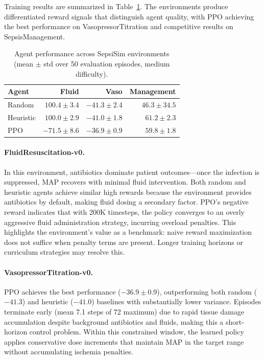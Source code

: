 \documentclass[11pt,a4paper]{article}
\begin{document}
Training results are summarized in Table~\ref{tab:results}. The environments produce differentiated reward signals that distinguish agent quality, with PPO achieving the best performance on VasopressorTitration and competitive results on SepsisManagement.

\begin{table}[htbp]
\centering
\caption{Agent performance across SepsiSim environments (mean $\pm$ std over 50 evaluation episodes, medium difficulty).}
\label{tab:results}
\begin{tabular}{lrrr}
\toprule
\textbf{Agent} & \textbf{Fluid} & \textbf{Vaso} & \textbf{Management} \\
\midrule
Random     & $100.4 \pm 3.4$ & $-41.3 \pm 2.4$ & $46.3 \pm 34.5$ \\
Heuristic  & $100.0 \pm 2.9$ & $-41.0 \pm 1.8$ & $61.2 \pm 2.3$ \\
PPO        & $-71.5 \pm 8.6$ & $\mathbf{-36.9 \pm 0.9}$ & $59.8 \pm 1.8$ \\
\bottomrule
\end{tabular}
\end{table}

\paragraph{FluidResuscitation-v0.} In this environment, antibiotics dominate patient outcomes---once the infection is suppressed, MAP recovers with minimal fluid intervention. Both random and heuristic agents achieve similar high rewards because the environment provides antibiotics by default, making fluid dosing a secondary factor. PPO's negative reward indicates that with 200K timesteps, the policy converges to an overly aggressive fluid administration strategy, incurring overload penalties. This highlights the environment's value as a benchmark: naive reward maximization does not suffice when penalty terms are present. Longer training horizons or curriculum strategies may resolve this.

\paragraph{VasopressorTitration-v0.} PPO achieves the best performance ($-36.9 \pm 0.9$), outperforming both random ($-41.3$) and heuristic ($-41.0$) baselines with substantially lower variance. Episodes terminate early (mean 7.1 steps of 72 maximum) due to rapid tissue damage accumulation despite background antibiotics and fluids, making this a short-horizon control problem. Within this constrained window, the learned policy applies conservative dose increments that maintain MAP in the target range without accumulating ischemia penalties.
\end{document}

